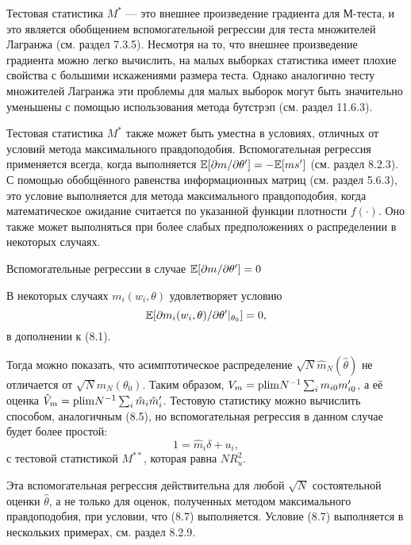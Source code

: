 Тестовая статистика $M^{*}$ --- это внешнее произведение градиента для М-теста, и это является обобщением вспомогательной регрессии для теста множителей Лагранжа (см. раздел 7.3.5). Несмотря на то, что внешнее произведение градиента можно легко вычислить, на малых выборках статистика имеет плохие свойства с большими искажениями размера теста. Однако аналогично тесту множителей Лагранжа эти проблемы для малых выборок могут быть значительно уменьшены с помощью использования метода бутстрэп (см. раздел 11.6.3).

Тестовая статистика $M^{*}$ также может быть уместна в условиях, отличных от условий метода максимального правдоподобия. Вспомогательная регрессия применяется всегда, когда выполняется $\mathbb{E}[\partial{m}/\partial{\theta}'] = - \mathbb{E}[ms']$ (см. раздел 8.2.3). С помощью обобщённого равенства информационных матриц (см. раздел 5.6.3), это условие выполняется для метода максимального правдоподобия, когда математическое ожидание считается по указанной функции плотности $f(\cdot)$. Оно также может выполняться при более слабых предположениях о распределении в некоторых случаях.

\begin{center}
Вспомогательные регрессии в случае $\mathbb{E}[\partial{m}/\partial{\theta}'] = 0$
\end{center}

В некоторых случаях $m_i(w_i, \theta)$ удовлетворяет условию
\begin{equation}
\mathbb{E}[\partial{m_i(w_i,\theta)}/\partial{\theta}'|_{\theta_0}] = 0,
\end{equation}
в дополнении к (8.1).

Тогда можно показать, что асимптотическое распределение $\sqrt{N} \hat{m}_N(\hat{\theta})$ не отличается от $\sqrt{N}m_N(\theta_0)$. Таким образом, $V_m = \mathrm{plim } N^{-1}\sum_i m_{i0}m_{i0}'$, а её оценка $\hat{V}_m = \mathrm{plim } N^{-1}\sum_i \hat{m}_i\hat{m}_i'$. Тестовую статистику можно вычислить способом, аналогичным (8.5), но вспомогательная регрессия в данном случае будет более простой:
\begin{equation}
1 = \hat{m}_i \delta + u_i,
\end{equation}
с тестовой статистикой $M^{**}$, которая равна $NR_u^2$.

Эта вспомогательная регрессия действительна для любой $\sqrt{N}$ состоятельной оценки $\hat{\theta}$, а не только
для оценок, полученных методом максимального правдоподобия, при условии, что (8.7) выполняется. Условие (8.7) выполняется в нескольких примерах, см. раздел 8.2.9.

